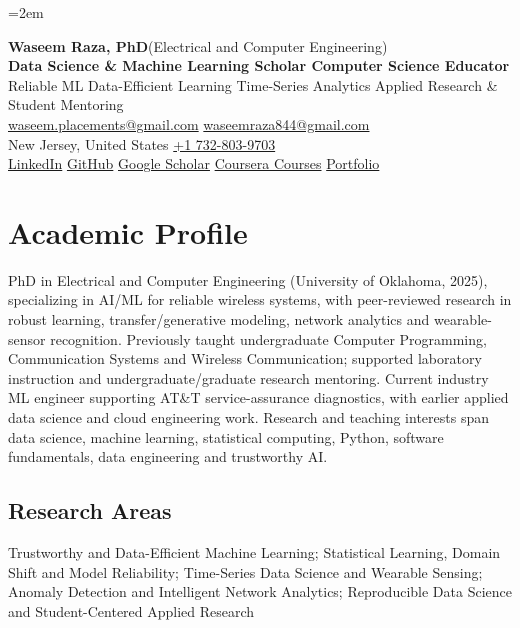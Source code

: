 \documentclass[9pt,letterpaper]{extarticle}
\begin{document}
\emergencystretch=2em
\begin{center}
{\LARGE\bfseries Waseem Raza, PhD}{\normalsize\mdseries \enspace (Electrical and Computer Engineering)}\\[2pt]
{\large\bfseries Data Science \& Machine Learning Scholar \textbar{} Computer Science Educator}\\[1pt]
{\small Reliable ML \textbar{} Data-Efficient Learning \textbar{} Time-Series Analytics \textbar{} Applied Research \& Student Mentoring}\\[3pt]
{\footnotesize {}\enspace \href{mailto:waseem.placements@gmail.com}{waseem.placements@gmail.com} \textbar{} \href{mailto:waseemraza844@gmail.com}{waseemraza844@gmail.com}\\[1pt]New Jersey, United States \quad {}\enspace \href{tel:+17328039703}{+1 732-803-9703}\\[1pt]\href{https://www.linkedin.com/in/waseem-raza-phd-9a737858/}{LinkedIn} \textbar{} \href{https://github.com/WaseemRaza844}{GitHub} \textbar{} \href{https://scholar.google.com/citations?user=d58Drr0AAAAJ\&hl=en}{Google Scholar} \textbar{} \href{https://waseemraza844.github.io/portfolio/learning.html}{Coursera Courses} \textbar{} \href{https://waseemraza844.github.io/portfolio/}{Portfolio}}
\end{center}
\vspace{-5pt}
\section{Academic Profile}
PhD in Electrical and Computer Engineering (University of Oklahoma, 2025), specializing in AI/ML for reliable wireless systems, with peer-reviewed research in robust learning, transfer/generative modeling, network analytics and wearable-sensor recognition. Previously taught undergraduate Computer Programming, Communication Systems and Wireless Communication; supported laboratory instruction and undergraduate/graduate research mentoring. Current industry ML engineer supporting AT\&T service-assurance diagnostics, with earlier applied data science and cloud engineering work. Research and teaching interests span data science, machine learning, statistical computing, Python, software fundamentals, data engineering and trustworthy AI.
\subsection{Research Areas}
Trustworthy and Data-Efficient Machine Learning; Statistical Learning, Domain Shift and Model Reliability; Time-Series Data Science and Wearable Sensing; Anomaly Detection and Intelligent Network Analytics; Reproducible Data Science and Student-Centered Applied Research\par
{}
\end{document}
